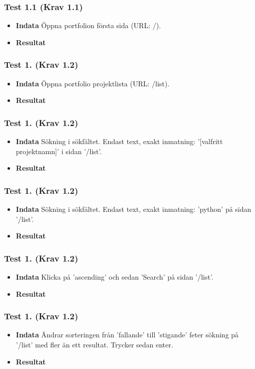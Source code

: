 \documentclass{TDP003mall}
\begin{document}
\subsubsection*{Test 1.1 (Krav 1.1)}
\begin{itemize}
\item[]\textbf{Indata} Öppna portfolion första sida (URL: /).
\item[]\textbf{Resultat} 
\end{itemize}
\subsubsection*{Test 1. (Krav 1.2)}
\begin{itemize}
\item[]\textbf{Indata} Öppna portfolio projektlista (URL: /list).
\item[]\textbf{Resultat} 
\end{itemize}
\subsubsection*{Test 1. (Krav 1.2)}
\begin{itemize}
\item[]\textbf{Indata} Sökning i sökfältet. Endast text, exakt inmatning: '[valfritt projektnamn]' i sidan '/list'.
\item[]\textbf{Resultat} 
\end{itemize} 
\subsubsection*{Test 1. (Krav 1.2)}
\begin{itemize}
\item[]\textbf{Indata} Sökning i sökfältet. Endast text, exakt inmatning: 'python' på sidan '/list'.
\item[]\textbf{Resultat} 
\end{itemize}
\subsubsection*{Test 1. (Krav 1.2)}
\begin{itemize}
\item[]\textbf{Indata} Klicka på 'ascending' och sedan 'Search' på sidan '/list'.
\item[]\textbf{Resultat} 
\end{itemize}
\subsubsection*{Test 1. (Krav 1.2)}
\begin{itemize}
\item[]\textbf{Indata} Ändrar sorteringen från 'fallande' till 'stigande' feter sökning på '/list' med fler än ett resultat. Trycker sedan enter.
\item[]\textbf{Resultat} 
\end{itemize}
\end{document}
